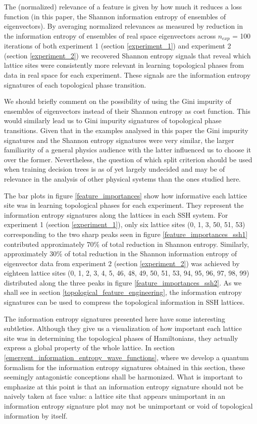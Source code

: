 \documentclass[10pt]{revtex4-1}
\begin{document}
The (normalized) relevance of a feature is given by how much it reduces a loss function (in this paper, the Shannon information entropy of ensembles of eigenvectors). By averaging normalized relevances as measured by reduction in the information entropy of ensembles of real space eigenvectors across $n_{exp}$ = 100 iterations of both experiment 1 (section \ref{experiment_1}) and experiment 2 (section \ref{experiment_2}) we recovered Shannon entropy signals that reveal which lattice sites were consistently more relevant in learning topological phases from data in real space for each experiment. These signals are the information entropy signatures of each topological phase transition. 

We should briefly comment on the possibility of using the Gini impurity of ensembles of eigenvectors \cite{friedman2001elements} instead of their Shannon entropy as cost function. This would similarly lead us to Gini impurity signatures of topological phase transitions. Given that in the examples analysed in this paper the Gini impurity signatures and the Shannon entropy signatures were very similar, the larger familiarity of a general physics audience with the latter influenced us to choose it over the former. Nevertheless, the question of which split criterion  should be used when training decision trees is as of yet largely undecided \cite{raileanu2004theoretical} and may be of relevance in the analysis of other physical systems than the ones studied here.       

The bar plots in figure \ref{feature_importances} show how informative each lattice site was in learning topological phases for each experiment. They represent the information entropy signatures along the lattices in each SSH system. For experiment 1 (section \ref{experiment_1}), only six lattice sites (0, 1, 3, 50, 51, 53) corresponding to the two sharp peaks seen in figure \ref{feature_importances_ssh1} contributed approximately 70\% of total reduction in Shannon entropy. Similarly, approximately 30\% of total reduction in the Shannon information entropy of eigenvector data from experiment 2 (section \ref{experiment_2}) was achieved by eighteen lattice sites (0, 1, 2, 3, 4, 5, 46, 48, 49, 50, 51, 53, 94, 95, 96, 97, 98, 99) distributed along the three peaks in figure \ref{feature_importances_ssh2}. As we shall see in section \ref{topological_feature_engineering}, the information entropy signatures can be used to compress the topological information in SSH lattices.

The information entropy signatures presented here have some interesting subtleties. Although they give us a visualization of how important each lattice site was in determining the topological phases of Hamiltonians, they actually express a global property of the whole lattice. In section \ref{emergent_information_entropy_wave_functions}, where we develop a quantum formalism for the information entropy signatures obtained in this section, these seemingly antagonistic conceptions shall be harmonized. What is important to emphasize at this point is that an information entropy signature should not be naively taken at face value: a lattice site that appears unimportant in an information entropy signature plot may not be unimportant or void of topological information by itself.
\end{document}
